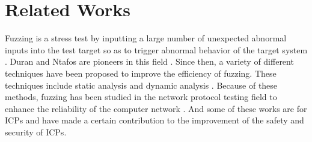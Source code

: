 \section{Related Works}

Fuzzing is a stress test by inputting a large number of unexpected abnormal inputs into the test target so as to trigger abnormal behavior of the target system \cite{kaschner2009automatic}. %
Duran and Ntafos are pioneers in this field \cite{duran1984evaluation}. %
Since then, a variety of different techniques have been proposed to improve the efficiency of fuzzing. These techniques include static analysis \cite{sparks2007automated} and  %
dynamic analysis  %
\cite{bastani2017synthesizing}. %
Because of these methods, fuzzing has been studied in the network protocol testing field to enhance the reliability of the computer network %
 \cite{chen2018iotfuzzer} \cite{martin2019catalogue}. 
And some of these works are for ICPs and have made a certain contribution to the improvement of the safety and security of ICPs. %

